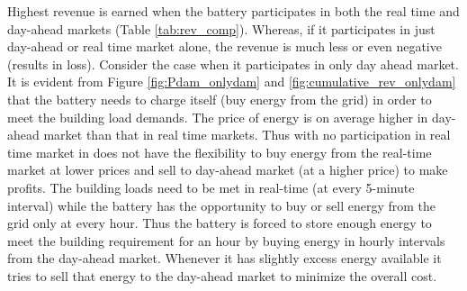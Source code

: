 \documentclass[11pt,twoside]{article}
\begin{document}
Highest revenue is earned when the battery participates in both the real time and day-ahead markets (Table \ref{tab:rev_comp}). Whereas, if it participates in just day-ahead or real time market alone, the revenue is much less or even negative (results in loss). Consider the case when it participates in only day ahead market. It is evident from Figure \ref{fig:Pdam_onlydam} and \ref{fig:cumulative_rev_onlydam} that the battery needs to charge itself (buy energy from the grid) in order to meet the building load demands. The price of energy is on average higher in day-ahead market than that in real time markets. Thus with no participation in real time market in does not have the flexibility to buy energy from the real-time market at lower prices and sell to day-ahead market (at a higher price) to make profits. The building loads need to be met in real-time (at every 5-minute interval) while the battery has the opportunity to buy or sell energy from the grid only at every hour. Thus the battery is forced to store enough energy to meet the building requirement for an hour by buying energy in hourly intervals from the day-ahead market. Whenever it has slightly excess energy available it tries to sell that energy to the day-ahead market to minimize the overall cost. 
\end{document}

